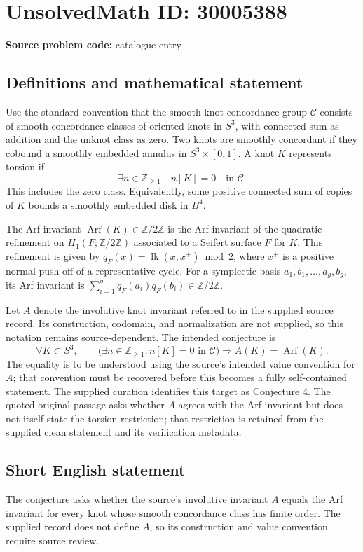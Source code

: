 \documentclass[11pt]{article}
\newcommand{\Z}{\mathbb{Z}}
\begin{document}
\section*{UnsolvedMath ID: 30005388}
\textbf{Source problem code:} catalogue entry
\subsection{Definitions and mathematical statement}
Use the standard convention that the smooth knot concordance group \(\mathcal C\) consists of smooth concordance classes of oriented knots in \(S^3\), with connected sum as addition and the unknot class as zero. Two knots are smoothly concordant if they cobound a smoothly embedded annulus in \(S^3\times[0,1]\). A knot \(K\) represents torsion if
\[
\exists n\in\Z_{\geq 1}\quad n[K]=0\quad\text{in }\mathcal C.
\]
This includes the zero class. Equivalently, some positive connected sum of copies of \(K\) bounds a smoothly embedded disk in \(B^4\).

The Arf invariant \(\operatorname{Arf}(K)\in\Z/2\Z\) is the Arf invariant of the quadratic refinement on \(H_1(F;\Z/2\Z)\) associated to a Seifert surface \(F\) for \(K\). This refinement is given by \(q_F(x)=\operatorname{lk}(x,x^+)\bmod 2\), where \(x^+\) is a positive normal push-off of a representative cycle. For a symplectic basis \(a_1,b_1,\ldots,a_g,b_g\), its Arf invariant is \(\sum_{i=1}^g q_F(a_i)q_F(b_i)\in\Z/2\Z\).

Let \(A\) denote the involutive knot invariant referred to in the supplied source record. Its construction, codomain, and normalization are not supplied, so this notation remains source-dependent. The intended conjecture is
\[
\forall K\subset S^3,\qquad
\bigl(\exists n\in\Z_{\geq1}:n[K]=0\text{ in }\mathcal C\bigr)
\Longrightarrow A(K)=\operatorname{Arf}(K).
\]
The equality is to be understood using the source's intended value convention for \(A\); that convention must be recovered before this becomes a fully self-contained statement. The supplied curation identifies this target as Conjecture 4. The quoted original passage asks whether \(A\) agrees with the Arf invariant but does not itself state the torsion restriction; that restriction is retained from the supplied clean statement and its verification metadata.
\subsection{Short English statement}
The conjecture asks whether the source's involutive invariant \(A\) equals the Arf invariant for every knot whose smooth concordance class has finite order. The supplied record does not define \(A\), so its construction and value convention require source review.
\end{document}

